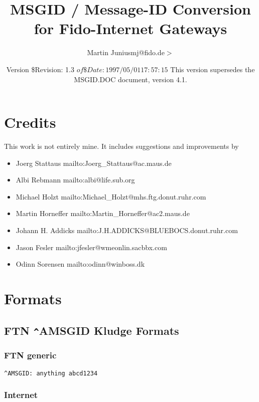 \documentclass{article}
\title{MSGID / Message-ID Conversion for Fido-Internet Gateways }
\author{Martin Junius{\ttfamily  {\(<\)}mj@fido.de{\(>\)}} }
\date{Version \$Revision: 1.3 $ of \$Date: 1997/05/01 17:57:15 $ This version supersedes the MSGID.DOC document, version 4.1.}
\begin{document}
\maketitle

\section{Credits }



This work is not entirely mine. It includes suggestions and improvements by 
\begin{itemize}
\item Joerg Stattaus 
mailto:Joerg\_Stattaus@ac.maus.de 
\item Albi Rebmann 
mailto:albi@life.sub.org 
\item Michael Holzt 
mailto:Michael\_Holzt@mhs.ftg.donut.ruhr.com 
\item Martin Horneffer 
mailto:Martin\_Horneffer@ac2.maus.de 
\item Johann H. Addicks 
mailto:J.H.ADDICKS@BLUEBOCS.donut.ruhr.com 
\item Jason Fesler 
mailto:jfesler@wmeonlin.sacbbx.com 
\item Odinn Sorensen 
mailto:odinn@winboss.dk  
\end{itemize}



\section{Formats }




\subsection{FTN \verb+^+AMSGID Kludge Formats }




\subsubsection{FTN generic }

\begin{verbatim}
^AMSGID: anything abcd1234 
\end{verbatim}



\subsubsection{Internet }
\end{document}
